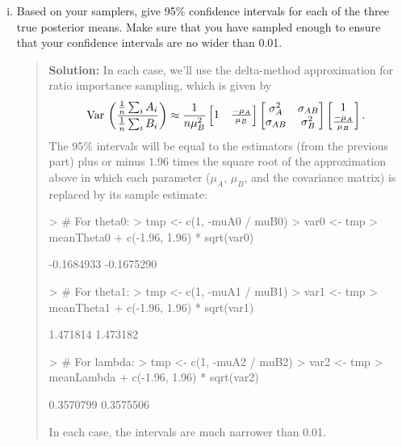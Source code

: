 \documentclass{article}
\def\Var{\mathop{\rm Var\,}\nolimits}
\begin{document}
\begin{enumerate}[(i)]
\item 
Based on your samplers,
give 95\% confidence intervals for each of the three true posterior
means.  Make sure that you have sampled enough to ensure that
your confidence intervals are no wider than 0.01.
\begin{quotation}{\bf Solution:}
In each case, we'll use the delta-method approximation for ratio importance sampling, 
which is given by 
      \[
      {\Var} \left( \frac{ \frac1n\sum_i A_i}{\frac1n\sum_i B_i} \right) \approx
      \frac{1}{n\mu_B^2}
      \begin{bmatrix}
      1 & \frac{-\mu_A}{\mu_B}
      \end{bmatrix}
      \begin{bmatrix}
      \sigma^2_A & \sigma_{AB} \\ \sigma_{AB} & \sigma^2_B
      \end{bmatrix}
      \begin{bmatrix}
      1 \\ \frac{-\mu_A}{\mu_B}
      \end{bmatrix}.
      \]
The 95\% intervals will be equal to the estimators (from the previous part) plus or minus
$1.96$ times the square root of the approximation above in which each parameter
($\mu_A$, $\mu_B$, and the covariance matrix) is replaced by its sample estimate:
\begin{Schunk}
\begin{Sinput}
> # For theta0:
> tmp <- c(1, -muA0 / muB0)
> var0 <- tmp %
> meanTheta0 + c(-1.96, 1.96) * sqrt(var0)
\end{Sinput}
\begin{Soutput}
[1] -0.1684933 -0.1675290
\end{Soutput}
\begin{Sinput}
> # For theta1:
> tmp <- c(1, -muA1 / muB1)
> var1 <- tmp %
> meanTheta1 + c(-1.96, 1.96) * sqrt(var1)
\end{Sinput}
\begin{Soutput}
[1] 1.471814 1.473182
\end{Soutput}
\begin{Sinput}
> # For lambda:
> tmp <- c(1, -muA2 / muB2)
> var2 <- tmp %
> meanLambda + c(-1.96, 1.96) * sqrt(var2)
\end{Sinput}
\begin{Soutput}
[1] 0.3570799 0.3575506
\end{Soutput}
\end{Schunk}
In each case, the intervals are much narrower than 0.01.
\end{quotation}

\end{enumerate}
\end{document}
